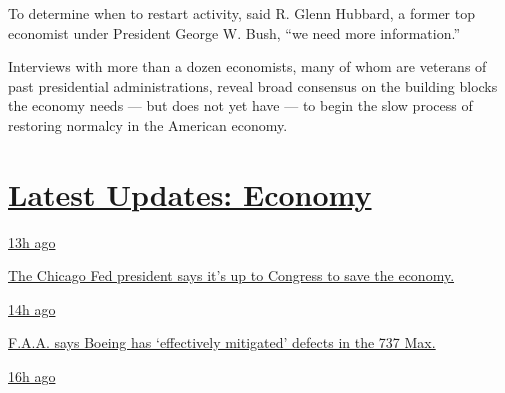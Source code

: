 To determine when to restart activity, said R. Glenn Hubbard, a former
top economist under President George W. Bush, ``we need more
information.''

Interviews with more than a dozen economists, many of whom are veterans
of past presidential administrations, reveal broad consensus on the
building blocks the economy needs --- but does not yet have --- to begin
the slow process of restoring normalcy in the American economy.

\hypertarget{latest-updates-economy}{%
\section{\texorpdfstring{\href{https://www.nytimes3xbfgragh.onion/live/2020/08/03/business/stock-market-today-coronavirus?action=click\&pgtype=Article\&state=default\&region=MAIN_CONTENT_1\&context=storylines_live_updates}{Latest
Updates:
Economy}}{Latest Updates: Economy}}\label{latest-updates-economy}}

\href{https://www.nytimes3xbfgragh.onion/live/2020/08/03/business/stock-market-today-coronavirus?action=click\&pgtype=Article\&state=default\&region=MAIN_CONTENT_1\&context=storylines_live_updates\#the-chicago-fed-president-says-its-up-to-congress-to-save-the-economy}{13h
ago}

\href{https://www.nytimes3xbfgragh.onion/live/2020/08/03/business/stock-market-today-coronavirus?action=click\&pgtype=Article\&state=default\&region=MAIN_CONTENT_1\&context=storylines_live_updates\#the-chicago-fed-president-says-its-up-to-congress-to-save-the-economy}{The
Chicago Fed president says it's up to Congress to save the economy.}

\href{https://www.nytimes3xbfgragh.onion/live/2020/08/03/business/stock-market-today-coronavirus?action=click\&pgtype=Article\&state=default\&region=MAIN_CONTENT_1\&context=storylines_live_updates\#faa-says-boeing-has-effectively-mitigated-defects-in-the-737-max}{14h
ago}

\href{https://www.nytimes3xbfgragh.onion/live/2020/08/03/business/stock-market-today-coronavirus?action=click\&pgtype=Article\&state=default\&region=MAIN_CONTENT_1\&context=storylines_live_updates\#faa-says-boeing-has-effectively-mitigated-defects-in-the-737-max}{F.A.A.
says Boeing has `effectively mitigated' defects in the 737 Max.}

\href{https://www.nytimes3xbfgragh.onion/live/2020/08/03/business/stock-market-today-coronavirus?action=click\&pgtype=Article\&state=default\&region=MAIN_CONTENT_1\&context=storylines_live_updates\#small-businesses-got-emergency-loans-but-not-what-they-expected}{16h
ago}

